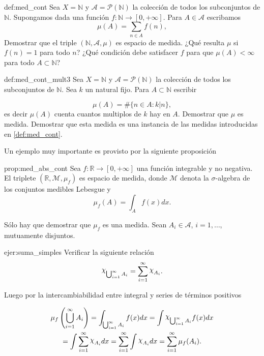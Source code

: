  
\begin{ejercicio}{def:med_cont} Sea $X=\mathbb{N}$  y $\mathscr{A}=\mathcal{P}(\mathbb{N})$ la colección de todos los subconjuntos de $\mathbb{N}$. Supongamos dada una función $f:\mathbb{N}\to [0,+\infty]$. Para $A\in\mathscr{A}$ escribamos 
\[\mu(A)=\sum_{n\in A}f(n), \] 
Demostrar que el triple $(\mathbb{N},\mathscr{A},\mu)$ es espacio de medida. ¿Qué resulta $\mu$ si $f(n)=1$ para todo $n$? ¿Qué condición debe satisfacer $f$ para que $\mu(A)<\infty$ para todo $A\subset\mathbb{N}$?
 
\end{ejercicio}

\begin{ejercicio}{def:med_cont_mult3} Sea $X=\mathbb{N}$  y $\mathscr{A}=\mathcal{P}(\mathbb{N})$ la colección de todos los subconjuntos de $\mathbb{N}$. Sea $k$ un natural fijo. Para $A\subset\mathbb{N}$ escribir

\[
 \mu(A)=\#\{ n\in A :  k|n \},
\]
es decir $\mu(A)$ cuenta cuantos multiplos de $k$ hay en $A$. Demostrar que $\mu$ es medida. Demostrar que esta medida es una instancia de las medidas introducidas en \eqref {def:med_cont}. 
\end{ejercicio}


Un ejemplo muy importante  es provisto por la siguiente proposición

\begin{proposicion}{prop:med_abs_cont}
 Sea $f:\mathbb{R}\to [0,+\infty]$ una función integrable y no negativa. El triplete
  $(\mathbb{R},\mathscr{M},\mu_f)$ es espacio de medida, donde $\mathscr{M}$ denota la $\sigma$-algebra de los conjuntos medibles Lebesgue y 
  \[\mu_f(A)=\int_A f(x)dx.\]
\end{proposicion}

\begin{demo}
 Sólo hay que demostrar que $\mu_f$ es una medida. Sean $A_i\in\mathscr{A}$, $i=1,\ldots$, mutuamente disjuntos. 
 
 \begin{ejercicio}{ejer:suma_simples}
  Verificar la siguiente relación
  \[
  \rchi_{\bigcup_{i=1}^{\infty}A_i}=\sum_{i=1}^{\infty}\rchi_{A_i}.
  \]


 \end{ejercicio}

 Luego por la intercambiabilidad entre integral y series de términos positivos

\begin{multline*}
 \mu_f\left(\bigcup_{i=1}^{\infty}A_i \right)=\int_{\bigcup_{i=1}^{\infty}A_i}f(x)dx=\int \rchi_{\bigcup_{i=1}^{\infty}A_i} f(x)dx\\=\int \sum_{i=1}^{\infty}\rchi_{A_i}dx= \sum_{i=1}^{\infty}\int\rchi_{A_i}dx= \sum_{i=1}^{\infty}\mu_f(A_i).
\end{multline*}

 
\end{demo}


